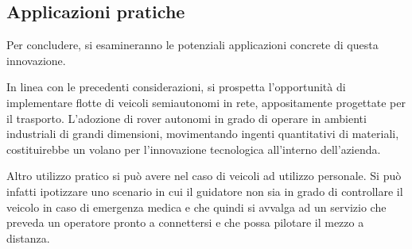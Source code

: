 \subsection{Applicazioni pratiche}
Per concludere, si esamineranno le potenziali applicazioni concrete di questa innovazione.

\noindent In linea con le precedenti considerazioni, si prospetta l'opportunità di implementare flotte di veicoli semiautonomi in rete, appositamente progettate per il trasporto. L'adozione di rover autonomi in grado di operare in ambienti industriali di grandi dimensioni, movimentando ingenti quantitativi di materiali, costituirebbe un volano per l'innovazione tecnologica all'interno dell'azienda.

\noindent Altro utilizzo pratico si può avere nel caso di veicoli ad utilizzo personale. Si può infatti ipotizzare uno scenario in cui il guidatore non sia in grado di controllare il veicolo in caso di emergenza medica e che quindi si avvalga ad un servizio che preveda un operatore pronto a connettersi e che possa pilotare il mezzo a distanza. 
